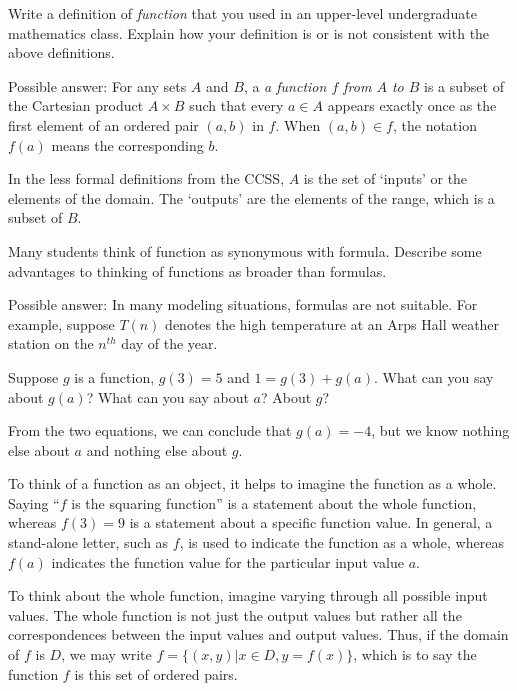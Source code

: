 \documentclass{ximera}
\begin{document}
\begin{question}
Write a definition of \emph{function} that you used in an upper-level undergraduate mathematics class.  Explain how your definition is or is not consistent with the above definitions.  
\begin{freeResponse}
Possible answer:  For any sets $A$ and $B$, a \emph{a function $f$ from $A$ to $B$} is a subset of the Cartesian product $A\times B$ such that
every $a\in A$ appears exactly once as the first element of an ordered pair $(a,b)$ in $f$. When $(a,b)\in f$, the notation $f(a)$ means the corresponding $b$.  

In the less formal definitions from the CCSS, $A$ is the set of `inputs' or the elements of the domain.  The `outputs' are the elements of the range, which is a subset of $B$.   
\end{freeResponse}
\end{question}


\begin{question}
Many students think of function as synonymous with formula.  Describe some advantages to thinking of functions as broader than formulas.
\begin{freeResponse}
Possible answer:  In many modeling situations, formulas are not suitable.  For example, suppose $T(n)$ denotes the high temperature 
at an Arps Hall weather station on the $n^{th}$ day of the year.  
\end{freeResponse}
\end{question}


\begin{question}
Suppose $g$ is a function, $g(3) = 5$ and $1=g(3)+g(a)$.  What can you say about $g(a)$?  What can you say about $a$?  About $g$?
\begin{freeResponse}
From the two equations, we can conclude that $g(a)=-4$, but we know nothing else about $a$ and nothing else about $g$.  
\end{freeResponse}
\end{question}

To think of a function as an object, it helps to imagine the function as a whole.  Saying ``$f$ is the squaring function'' is a statement about the whole function, whereas $f(3) = 9$ is a statement about a specific function value.  In general, a stand-alone letter, such as $f$, is used to indicate the function as a whole, whereas $f(a)$ indicates the function value for the particular input value $a$.  

To think about the whole function, imagine varying through all possible input values.  The whole function is not just the output values but rather all the correspondences between the input values and output values.  Thus, if the domain of $f$ is $D$, we may write $f=\{(x,y) | x\in D, y=f(x)\}$, which is to say the function $f$ is this set of ordered pairs.  
\end{document}
